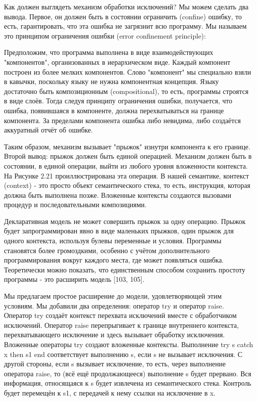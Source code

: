 Как должен выглядеть механизм обработки исключений? Мы можем сделать два вывода. Первое, он должен быть в состоянии ограничить (confine) ошибку, то есть, гарантировать, что эта ошибка не загрязнит всю программу. Мы называем это принципом ограничения ошибки (error confinement principle):

Предположим, что программа выполнена в виде взаимодействующих "компонентов", организованных в иерархическом виде. Каждый компонент построен из более мелких компонентов. Слово "компонент" мы специально взяли в кавычки, поскольку языку не нужна компонентная концепция. Языку достаточно быть композиционным (compositional), то есть, программы строятся в виде слоёв. Тогда следуя принципу ограничения ошибки, получается, что ошибка, появившаяся в компоненте, должна перехватываться на границе компонента. За пределами компонента ошибка либо невидима, либо создаётся аккуратный отчёт об ошибке.

Таким образом, механизм вызывает "прыжок" изнутри компонента к его границе. Второй вывод: прыжок должен быть единой операцией. Механизм должен быть в состоянии, в единой операции, выйти из любого уровня вложенности контекста. На Рисунке 2.21 проиллюстрирована эта операция. В нашей семантике, контекст (context) - это просто объект семантического стека, то есть, инструкция, которая должна быть выполнена позже. Вложенные контексты создаются вызовами процедур и последовательными композициями.

Декларативная модель не может совершить прыжок за одну операцию. Прыжок будет запрограммирован явно в виде маленьких прыжков, один прыжок для одного контекста, используя булевы переменные и условия. Программы становятся более громоздкими, особенно с учётом дополнительного программирования вокруг каждого места, где может появляться ошибка. Теоретически можно показать, что единственным способом сохранить простоту программы - это расширить модель [103, 105].

Мы предлагаем простое расширение до модели, удовлетворяющей этим условиям. Мы добавили два определения: оператор try и оператор raise. Оператор try создаёт контекст перехвата исключений вместе с обработчиком исключений. Оператор raise перепрыгивает к границе внутреннего контекста, перехватывающего исключение и здесь вызывает обработку исключения. Вложенные операторы try создают вложенные контексты. Выполнение try s catch x then s1 end соответствует выполнению s, если s не вызывает исключения. С другой стороны, если s вызывает исключение, то есть, через выполнение оператора raise, то (всё ещё продолжающееся) выполнение s будет прервано. Вся информация, относящаяся к s будет извлечена из семантического стека. Контроль будет перемещён к s1, с передачей к нему ссылки на исключение в x.

